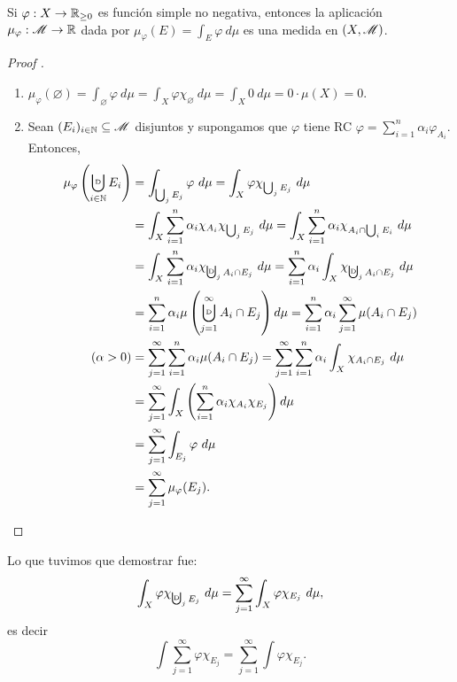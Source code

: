 \begin{lemma}
	Si $\varphi : X \to \mathbb{R}_{\geq 0}$ es función simple no negativa, entonces la aplicación $\mu_{\varphi} : \mathscr{M} \to \mathbb{R}$ dada por $\mu_{\varphi}(E) = \int_{E} \varphi \ d\mu$ es una medida en $(X, \mathscr{M})$.
\end{lemma}
\begin{proof}[Proof ]
	\begin{enumerate}
		\item $\mu_{\varphi}(\varnothing) = \int_{\varnothing} \varphi \ d\mu = \int_{X} \varphi \chi_{\varnothing} \ d\mu = \int_{X} 0 \ d\mu = 0 \cdot \mu(X) = 0$.

		\item Sean $(E_{i})_{i\in\mathbb{N}} \subseteq \mathscr{M}$ disjuntos y supongamos que $\varphi$ tiene RC $\varphi = \sum_{i=1}^{n} \alpha_{i} \varphi_{A_{i}}$. Entonces,
		\begin{align*}
			\mu_{\varphi}\left(\bigcupd_{i\in\N} E_{i}\right) &= \int_{\bigcup_{j} E_{j}} \varphi \ d\mu = \int_{X} \varphi \chi_{\bigcup_{j} E_{j}} \ d\mu \\
			&= \int_{X} \sum_{i=1}^{n} \alpha_{i} \chi_{A_{i}} \chi_{\bigcup_{j} E_{j}} \ d\mu = \int_{X} \sum_{i=1}^{n} \alpha_{i} \chi_{A_{i} \cap \bigcup_{i} E_{i}} \ d\mu \\
			&= \int_{X} \sum_{i=1}^{n} \alpha_{i} \chi_{\textbigcupd_{j} A_{i} \cap E_{j}} \ d\mu = \sum_{i=1}^{n} \alpha_{i} \int_{X} \chi_{\textbigcupd_{j} A_{i} \cap E_{j}} \ d\mu \\
			&= \sum_{i=1}^{n} \alpha_{i} \mu\left( \bigcupd_{j=1}^{\infty} A_{i} \cap E_{j} \right) d\mu = \sum_{i=1}^{n} \alpha_{i} \sum_{j=1}^{\infty} \mu(A_{i} \cap E_{j}) \\
			(\alpha > 0) &= \sum_{j=1}^{\infty} \sum_{i=1}^{n} \alpha_{i} \mu(A_{i} \cap E_{j}) = \sum_{j=1}^{\infty} \sum_{i=1}^{n} \alpha_{i} \int_{X} \chi_{A_{i} \cap E_{j}} \ d\mu \\
			&= \sum_{j=1}^{\infty} \int_{X} \left( \sum_{i=1}^{n} \alpha_{i} \chi_{A_{i}} \chi_{E_{j}} \right) d\mu \\
			&= \sum_{j=1}^{\infty} \int_{E_{j}} \varphi \ d\mu \\
			&= \sum_{j=1}^{\infty} \mu_{\varphi}(E_{j})
		.\qedhere\end{align*}
	\end{enumerate}
\end{proof}

\begin{remark}
	Lo que tuvimos que demostrar fue:
	\[ \int_{X} \varphi \chi_{\textbigcupd_{j} E_{j}} \ d\mu = \sum_{j=1}^{\infty} \int_{X} \varphi \chi_{E_{j}} \ d\mu, \]
	es decir
	\[ \int \sum_{j=1}^{\infty} \varphi \chi_{E_{j}} = \sum_{j=1}^{\infty} \int \varphi \chi_{E_{j}}. \]
\end{remark}

